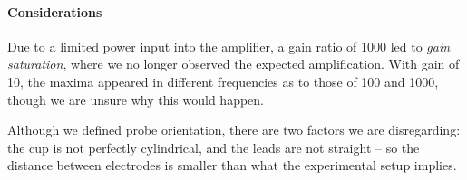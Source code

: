 \paragraph{Considerations}

Due to a limited power input into the amplifier, a gain ratio of 1000 led to \textit{gain saturation}, where we no longer observed the expected amplification.
With gain of 10, the maxima appeared in different frequencies as to those of 100 and 1000, though we are unsure why this would happen.

Although we defined probe orientation, there are two factors we are disregarding: the cup is not perfectly cylindrical, and the leads are not straight -- so the distance between electrodes is smaller than what the experimental setup implies.